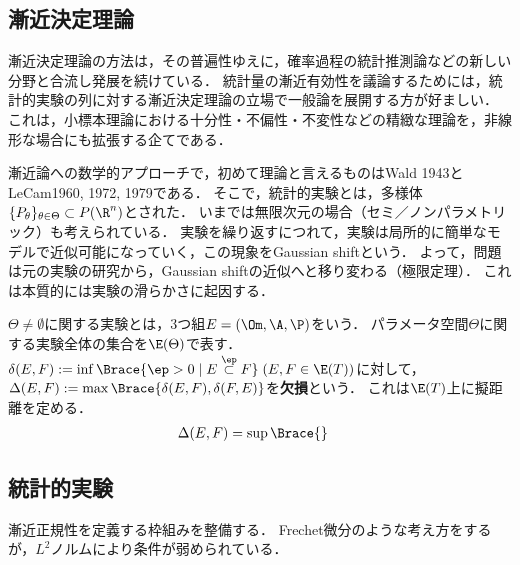 \documentclass[uplatex,dvipdfmx]{jsreport}
\begin{document}
\subsection{漸近決定理論}

\begin{tcolorbox}[colframe=ForestGreen, colback=ForestGreen!10!white,breakable,colbacktitle=ForestGreen!40!white,coltitle=black,fonttitle=\bfseries\sffamily,
title=]
    漸近決定理論の方法は，その普遍性ゆえに，確率過程の統計推測論などの新しい分野と合流し発展を続けている．
    統計量の漸近有効性を議論するためには，統計的実験の列に対する漸近決定理論の立場で一般論を展開する方が好ましい．
    これは，小標本理論における十分性・不偏性・不変性などの精緻な理論を，非線形な場合にも拡張する企てである．
\end{tcolorbox}

\begin{history}
    漸近論への数学的アプローチで，初めて理論と言えるものはWald 1943とLeCam1960, 1972, 1979である．
    そこで，統計的実験とは，多様体$\{P_\theta\}_{\theta\in\Theta}\subset P(\R^n)$とされた．
    いまでは無限次元の場合（セミ／ノンパラメトリック）も考えられている．
    実験を繰り返すにつれて，実験は局所的に簡単なモデルで近似可能になっていく，この現象をGaussian shiftという．
    よって，問題は元の実験の研究から，Gaussian shiftの近似へと移り変わる（極限定理）．
    これは本質的には実験の滑らかさに起因する．
\end{history}

\begin{definition}
    $\Theta\ne\emptyset$に関する実験とは，3つ組$E=(\Om,\A,\P)$をいう．
    パラメータ空間$\Theta$に関する実験全体の集合を$\E(\Theta)$で表す．
    $\delta(E,F):=\inf\Brace{\ep>0\mid E\overset{\ep}{\subset} F}\;(E,F\in\E(T))$に対して，$\Delta(E,F):=\max\Brace{\delta(E,F),\delta(F,E)}$を\textbf{欠損}という．
    これは$\E(T)$上に擬距離を定める．
    \begin{align*}
        \Delta(E,F)&=\sup\Brace{}
    \end{align*}
\end{definition}

\subsection{統計的実験}

\begin{tcolorbox}[colframe=ForestGreen, colback=ForestGreen!10!white,breakable,colbacktitle=ForestGreen!40!white,coltitle=black,fonttitle=\bfseries\sffamily,
title=]
    漸近正規性を定義する枠組みを整備する．
    Frechet微分のような考え方をするが，$L^2$ノルムにより条件が弱められている\cite{Ibragimov HasMinskii}．
\end{tcolorbox}
\end{document}
